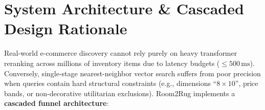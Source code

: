 \documentclass[11pt,a4paper]{article}
\begin{document}
\section{System Architecture \& Cascaded Design Rationale}

Real-world e-commerce discovery cannot rely purely on heavy transformer reranking across millions of inventory items due to latency budgets ($\le 500\,\text{ms}$). Conversely, single-stage nearest-neighbor vector search suffers from poor precision when queries contain hard structural constraints (e.g., dimensions ``$8\times 10$'', price bands, or non-decorative utilitarian exclusions). Room2Rug implements a \textbf{cascaded funnel architecture}:
\end{document}
